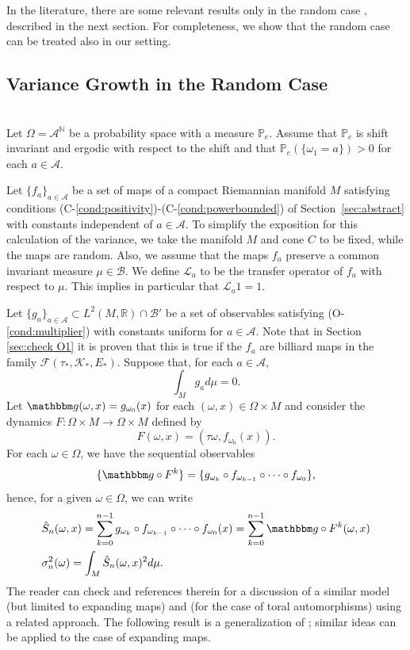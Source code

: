 \documentclass{amsart}
\numberwithin{equation}{section}
\newcommand\cA{{\mathcal A}}
\newcommand\cB{{\mathcal B}}
\newcommand\cF{{\mathcal F}}
\newcommand\cK{{\mathcal K}}
\newcommand\cL{{\mathcal L}}
\newcommand\bN{{\mathbb N}}
\newcommand\bP{{\mathbb P}}
\newcommand\bR{{\mathbb R}}
\newcommand{\bbg}{\mathbbm g}
\newcommand{\Pe}{\bP_{\! e}}
\begin{document}
In the literature, there are some relevant results only in the random case  \cite{DFGV18, DFGV18bis, DH21}, described in the next section. For completeness, we show that the random case can be treated also in our setting.



\subsection{Variance Growth in the Random Case}\label{sec:random}\ \\
Let $\Omega=\cA^\bN$ be a probability space with a measure $\Pe$. Assume that $\Pe$ is shift invariant and ergodic with respect to the shift and that $\Pe(\{\omega_1=a\})>0$ for each $a\in \cA$. 


Let $\{f_a\}_{a\in\cA}$ be a set of  maps of a compact Riemannian manifold $M$ satisfying conditions 
(C-\ref{cond:positivity})-(C-\ref{cond:powerbounded}) of Section~\ref{sec:abstract} with constants independent of $a \in \cA$.  To simplify the exposition for this calculation of the variance, we take the manifold $M$ and cone $C$ to be fixed,
while the maps are random. Also, we assume that the maps $f_a$ preserve a common invariant measure 
$\mu \in \cB$. 
We define $\cL_a$ to be the transfer operator of $f_a$ with respect to $\mu$.  This implies
in particular that $\cL_a 1 = 1$.

Let  $\{g_a\}_{a\in\cA}\subset L^2(M,\bR) \cap \cB'$ be a set of observables satisfying (O-\ref{cond:multiplier})
with constants uniform for $a \in \cA$.  Note that in Section \ref{sec:check O1} it is proven that this is true if the $f_a$ are billiard maps in the family $\cF(\tau_*, \cK_*, E_*)$.
Suppose that, for each $a\in\cA$,
\[
\int_M g_a d\mu =0.
\]
 Let  $\bbg(\omega,x)=g_{\omega_0}(x)$ for each $(\omega,x)\in\Omega\times M$ and consider the dynamics $F:\Omega\times M\to\Omega\times M$ defined by
\begin{equation}\label{eq:skew}
F(\omega,x)=(\tau\omega, f_{\omega_0}(x)).
\end{equation}
For each $\omega\in\Omega$, we have the sequential observables 
\[
\{\bbg\circ F^k\}=\{g_{\omega_k}\circ f_{\omega_{k-1}}\circ\cdots \circ f_{\omega_0}\},
\]
hence, for a given $\omega\in\Omega$, we can write
\[
\begin{split}
&\hat S_n(\omega,x)=\sum_{k=0}^{n-1}g_{\omega_k}\circ f_{\omega_{k-1}}\circ\cdots \circ f_{\omega_0}(x)=\sum_{k=0}^{n-1}\bbg\circ F^k(\omega, x)\\
&\sigma_n^2(\omega)=\int_M \hat S_n(\omega,x)^2 d\mu.
\end{split}
\]
The reader can check \cite{DFGV18, DFGV18bis, DH21} and references therein for a discussion of a similar model (but limited to expanding maps) and \cite{ALS09} (for the case of toral automorphisms) using a related approach. The following result is a generalization of \cite{ALS09}; similar ideas can be applied to the case of expanding maps.
\end{document}
